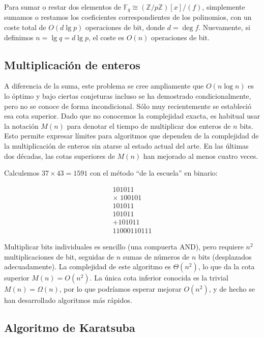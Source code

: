 Para sumar o restar dos elementos de \(\mathbb{F}_q\cong(\mathbb{Z}/p\mathbb{Z})[x]/(f)\), simplemente sumamos o restamos los coeficientes correspondientes de los polinomios, con un coste total de \(O(d\lg p)\) operaciones de bit, donde \(d=\deg f\). Nuevamente, si definimos \(n=\lg q=d\lg p\), el coste es \(O(n)\) operaciones de bit.

\subsection{Multiplicación de enteros}
A diferencia de la suma, este problema se cree ampliamente que \(O(n\log n)\) es lo óptimo y bajo ciertas conjeturas incluso se ha demostrado condicionalmente, pero no se conoce de forma incondicional. Sólo muy recientemente se estableció esa cota superior. Dado que no conocemos la complejidad exacta, es habitual usar la notación \(M(n)\) para denotar el tiempo de multiplicar dos enteros de \(n\) bits. Esto permite expresar límites para algoritmos que dependen de la complejidad de la multiplicación de enteros sin atarse al estado actual del arte. En las últimas dos décadas, las cotas superiores de \(M(n)\) han mejorado al menos cuatro veces.

Calculemos \(37\times43=1591\) con el método “de la escuela” en binario:

\[
\begin{array}{r}
   101011\\
\times\;100101\\\hline
   101011\\
   101011\;\;\\
 + 101011\;\;\\\hline
 11000110111
\end{array}
\]

Multiplicar bits individuales es sencillo (una compuerta AND), pero requiere \(n^2\) multiplicaciones de bit, seguidas de \(n\) sumas de números de \(n\) bits (desplazados adecuadamente). La complejidad de este algoritmo es \(\Theta(n^2)\), lo que da la cota superior \(M(n)=O(n^2)\). La única cota inferior conocida es la trivial \(M(n)=\Omega(n)\), por lo que podríamos esperar mejorar \(O(n^2)\), y de hecho se han desarrollado algoritmos más rápidos.  

\subsection{Algoritmo de Karatsuba}

